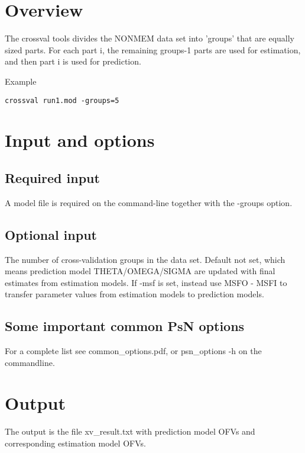



\maketitle
\newcommand{\guidetoolname}{crossval}


\section{Overview}

The crossval tools divides the NONMEM data set into 'groups' that are equally sized parts.
For each part i, the remaining groups-1 parts are used for estimation,
and then part i is used for prediction.

Example
\begin{verbatim}
crossval run1.mod -groups=5
\end{verbatim}

\section{Input and options}

\subsection{Required input}
A model file is required on the command-line together with the -groups option.

\subsection{Optional input}

\begin{optionlist}
The number of cross-validation groups in the data set.
\nextopt
{}
Default not set, which means prediction model THETA/OMEGA/SIGMA are updated
with final estimates from estimation models.
If -msf is set, instead use MSFO - MSFI to transfer parameter values
from estimation models to prediction models.
\nextopt
\end{optionlist}

\subsection{Some important common PsN options}
For a complete list see common\_options.pdf, 
or psn\_options -h on the commandline.


\section{Output}

The output is the file xv\_result.txt with prediction model OFVs and
corresponding estimation model OFVs.


